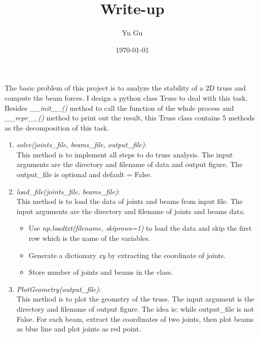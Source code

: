 \documentclass{article}
\title{Write-up}
\author{Yu Gu}
\date{\today}
\begin{document}
\maketitle

The basic problem of this project is to analyze the stability of a 2D truss and compute the beam forces. I design a python class Truss to deal with this task. Besides  \emph{\_\_init\_\_()} method to call the function of the whole process and \emph{\_\_repr\_\_()} method to print out the result, this Truss class contains 5 methods as the decomposition of this task.

\setlength{\parindent}{0pt}\begin{enumerate}
\item \emph{solve(joints\_file, beams\_file, output\_file)}:\\
This method is to implement all steps to do truss analysis. The input arguments are the directory and filename of data and output figure. The output\_file is optional and default = False.

\item \emph{load\_file(joints\_file, beams\_file)}:\\
This method is to load the data of joints and beams from input file. The input arguments are the directory and filename of joints and beams data.
\begin{itemize}
\item Use \emph{np.loadtxt(filename, skiprows=1)} to load the data and skip the first row which is the name of the variables.
\item Generate a dictionary \emph{xy} by extracting the coordinate of joints.
\item Store number of joints and beams in the class.
\end{itemize}

\item \emph{PlotGeometry(output\_file)}:\\
This method is to plot the geometry of the truss. The input argument is the directory and filename of output figure. The idea is: while output\_file is not False. For each beam, extract the coordinates of two joints, then plot beams as blue line and plot joints as red point. 


\end{enumerate}
\end{document}
